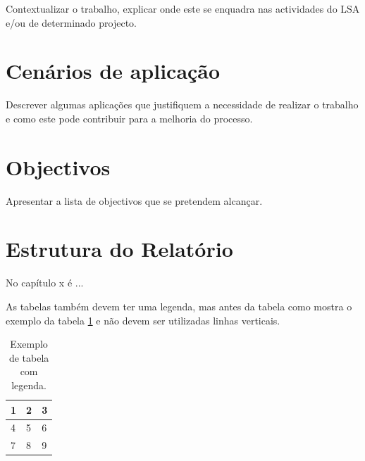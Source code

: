 Contextualizar o trabalho, explicar onde este se enquadra nas actividades do LSA e/ou de determinado projecto.

\section{Cenários de aplicação}
Descrever algumas aplicações que justifiquem a necessidade de realizar o trabalho e como este pode contribuir para a melhoria do processo.

\section{Objectivos}
Apresentar a lista de objectivos que se pretendem alcançar.

\section{Estrutura do Relatório}
No capítulo x é ...


\newpage

As tabelas também devem ter uma legenda, mas antes da tabela como mostra o exemplo da tabela \ref{tab:exemplo} e não devem ser utilizadas linhas verticais.

\begin{table}[h!]
\begin{center}
    \caption{Exemplo de tabela com legenda.}
    \begin{tabular}{lll}\hline
      1 & 2 & 3\\\hline
      4 & 5 & 6\\\hline
      7 & 8 & 9\\\hline
    \end{tabular}
    \label{tab:exemplo}
\end{center}
\end{table}

